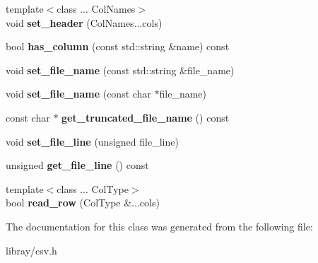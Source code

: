 \begin{DoxyCompactItemize}
{\footnotesize template$<$class ... Col\+Names$>$ }\\void {\bfseries set\+\_\+header} (Col\+Names...\+cols)
\item 
\mbox{\label{classio_1_1CSVReader_aaba91fff6faea12e451943e8d32a5a17}} 
bool {\bfseries has\+\_\+column} (const std\+::string \&name) const
\item 
\mbox{\label{classio_1_1CSVReader_a4096c1e43a4fba2b4f5ae21d047b5fbc}} 
void {\bfseries set\+\_\+file\+\_\+name} (const std\+::string \&file\+\_\+name)
\item 
\mbox{\label{classio_1_1CSVReader_a5f1dc083a8fa8661f5ecdcf6aebc7b24}} 
void {\bfseries set\+\_\+file\+\_\+name} (const char $\ast$file\+\_\+name)
\item 
\mbox{\label{classio_1_1CSVReader_abc6321895152f5a34959b499da6512ee}} 
const char $\ast$ {\bfseries get\+\_\+truncated\+\_\+file\+\_\+name} () const
\item 
\mbox{\label{classio_1_1CSVReader_a1303bd6a2eb0d3d7c743212e52839ac4}} 
void {\bfseries set\+\_\+file\+\_\+line} (unsigned file\+\_\+line)
\item 
\mbox{\label{classio_1_1CSVReader_a065f805596018d1568b81152e6a22e0c}} 
unsigned {\bfseries get\+\_\+file\+\_\+line} () const
\item 
\mbox{\label{classio_1_1CSVReader_a61ecdcaa62c024bf97c4e5d133478d7e}} 
{\footnotesize template$<$class ... Col\+Type$>$ }\\bool {\bfseries read\+\_\+row} (Col\+Type \&...cols)
\end{DoxyCompactItemize}


The documentation for this class was generated from the following file\+:\begin{DoxyCompactItemize}
\item 
libray/csv.\+h\end{DoxyCompactItemize}
